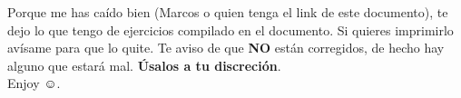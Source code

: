 Porque me has caído bien (Marcos o quien tenga el link de este documento), te dejo lo que tengo de ejercicios compilado en el documento. Si quieres imprimirlo avísame para que lo quite. Te aviso de que \textbf{NO} están corregidos, de hecho hay alguno que estará mal. \textbf{Úsalos a tu discreción}.\\

Enjoy $\smiley$. 

